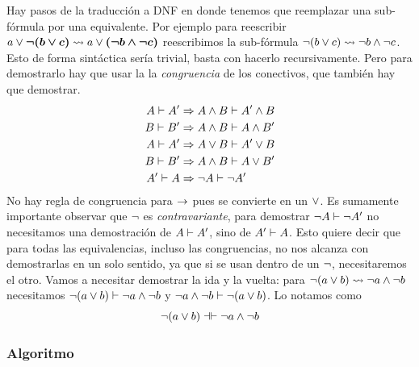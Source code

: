 Hay pasos de la traducción a DNF en donde tenemos que reemplazar una sub-fórmula por una equivalente.  Por ejemplo para reescribir
\(
    a \vee \bm{\neg (b \vee c)}
    \rightsquigarrow
    a \vee \bm{(\neg b \wedge \neg c)}
\)
reescribimos la sub-fórmula $\neg
(b \vee
c) \rightsquigarrow \neg b \wedge \neg c$.
Esto de forma sintáctica sería trivial, basta con hacerlo recursivamente. Pero para demostrarlo hay que usar la la
\textit{congruencia} de los conectivos, que también hay que demostrar.
\begin{align*}
    A \vdash A'
        &\Rightarrow A \wedge B \vdash A' \wedge B\\
    B \vdash B'
        &\Rightarrow A \wedge B \vdash A \wedge B'\\
    A \vdash A'
        &\Rightarrow A \vee B \vdash A' \vee B\\
    B \vdash B'
        &\Rightarrow A \wedge B \vdash A \vee B'\\
    A' \vdash A
        &\Rightarrow \neg A \vdash \neg A'
\end{align*}
No hay regla de congruencia para $\to$ pues se convierte en un $\vee$. Es
sumamente importante observar que $\neg$ es \textit{contravariante}, para
demostrar $\neg A \vdash \neg A'$ no necesitamos una demostración
de $A \vdash A'$, sino de $A' \vdash A$. Esto quiere decir que
para todas las equivalencias, incluso las congruencias, no nos alcanza con
demostrarlas en un solo sentido, ya que si se usan dentro de un $\neg$, necesitaremos el otro. Vamos a necesitar demostrar la
ida y la vuelta: para $\neg(a \vee b) \rightsquigarrow
\neg a \wedge \neg b$ necesitamos
\(
    \neg(a \vee b)
        \vdash \neg a \wedge \neg b
\) y \(
    \neg a \wedge \neg b \vdash \neg(a \vee b)
\). Lo notamos como \[
    \neg(a \vee b)
        \dashv\vdash \neg a \wedge \neg b
\]

\subsubsection{Algoritmo}
\label{ppa:sec:dnf:algoritmo}

